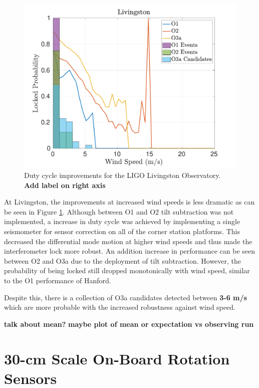 \documentclass [12pt, proquest]{uwthesis}[2019]
\begin{document}
\begin{figure}%
\begin{center}
\includegraphics[width=\textwidth]{LLO_WindVsLockEvents.pdf}
\caption{Duty cycle improvements for the LIGO Livingston Observatory. \textbf{Add label on right axis}}
\label{LLO_events}
\end{center}
\end{figure}

At Livingston, the improvements at increased wind speeds is less dramatic as can be seen in Figure \ref{LLO_events}. Although between O1 and O2 tilt subtraction was not implemented, a increase in duty cycle was achieved by implementing a single seismometer for sensor correction on all of the corner station platforms. This decreased the differential mode motion at higher wind speeds and thus made the interferometer lock more robust. An addition increase in performance can be seen between O2 and O3a due to the deployment of tilt subtraction. However, the probability of being locked still dropped monotonically with wind speed, similar to the O1 performance of Hanford.

Despite this, there is a collection of O3a candidates detected between \textbf{3-6 m/s} which are more probable with the increased robustness against wind speed.

\textbf{talk about mean?}
\textbf{maybe plot of mean or expectation vs observing run}

\chapter{30-cm Scale On-Board Rotation Sensors}\label{cBRS_chap}
\end{document}
